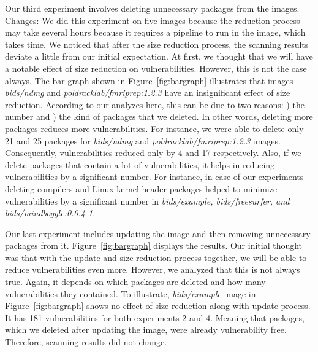\documentclass[a4paper,num-refs]{oup-contemporary}
\newcommand{\change}[2]{\color{cyan}Changes: #1\color{black}}
\newcommand{\rom}[1]{\lowercase\expandafter{\romannumeral #1\relax}}
\begin{document}
Our third experiment involves deleting unnecessary packages from the images.
\change{We did this experiment on five images because the reduction process may take
several hours because it requires 
a pipeline to run in the image, which takes time. We noticed that
after the size reduction process, the scanning results deviate a little from our initial expectation.
At first, we thought that we will have a notable effect of size reduction on
vulnerabilities. However, this is not the case always. The bar graph shown in
Figure~\ref{fig:bargraph} illustrates that images \textit{bids/ndmg} and
\textit{poldracklab/fmriprep:1.2.3} have an insignificant effect of size reduction.
According to our analyzes here, this can be due to two reasons: \rom{1}) the number
and \rom{2}) the kind of packages that we deleted. In other
words, deleting more packages reduces more vulnerabilities. 
For instance, we were able to delete only 21 and 25 packages for 
\textit{bids/ndmg} and \textit{poldracklab/fmriprep:1.2.3} images. Consequently, vulnerabilities
reduced only by 4 and 17 respectively. 
Also, if we delete packages that contain a lot of vulnerabilities, it helps in reducing
vulnerabilities by a significant number. For instance, in case of our experiments
deleting compilers and Linux-kernel-header packages helped to minimize vulnerabilities
by a significant number in \textit{bids/example, bids/freesurfer, and bids/mindboggle:0.0.4-1}.} 

\subsection{Combined Effect Of Update and Size Reduction}

Our last experiment includes updating the image and then removing unnecessary packages from it.
Figure~\ref{fig:bargraph} displays the results. 
Our initial thought was that with the update and size reduction process together, we will be able to
reduce vulnerabilities even more. However,
we analyzed that this is not always true. Again, it depends on which packages are deleted and how
many vulnerabilities they contained. To illustrate, \textit{bids/example} image in Figure~\ref{fig:bargraph}
shows no effect of size reduction along with update process. It has 181 vulnerabilities for both experiments 2 and 4.
Meaning that packages, which we deleted after updating the image, were already vulnerability free. Therefore,
scanning results did not change.
\end{document}
